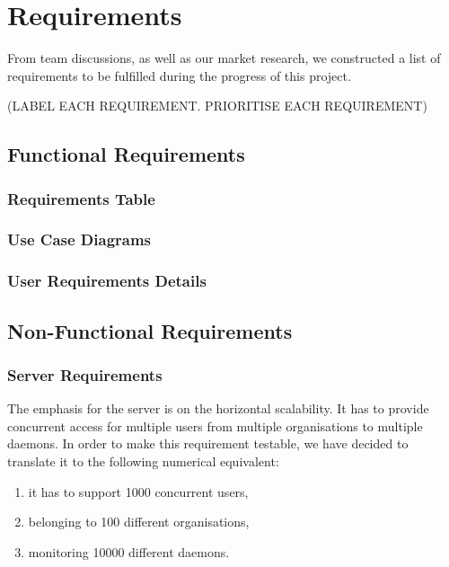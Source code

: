 \documentclass{l3proj}
\begin{document}


\chapter{Requirements}
\label{req}

From team discussions, as well as our market research, we constructed a list of requirements to be fulfilled during the progress of this project.

(LABEL EACH REQUIREMENT. PRIORITISE EACH REQUIREMENT)

\section{Functional Requirements}


\subsection{Requirements Table}

\subsection{Use Case Diagrams}

\subsection{User Requirements Details}

\section{Non-Functional Requirements}


\subsection{Server Requirements}

The emphasis for the server is on the horizontal scalability. It has to provide concurrent access for multiple users from multiple organisations to multiple daemons. In order to make this requirement testable, we have decided to translate it to the following numerical equivalent:
\begin{enumerate}
\item it has to support 1000 concurrent users,
\item belonging to 100 different organisations,
\item monitoring 10000 different daemons.
\end{enumerate}
\end{document}
